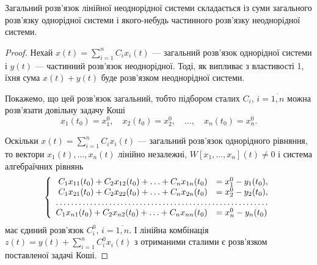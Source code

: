 \begin{theorem}
	Загальний розв'язок лінійної неоднорідної системи складається із суми загального розв'язку однорідної системи і якого-небудь частинного розв'язку неоднорідної системи.
\end{theorem}

\begin{proof}
	Нехай $x(t) = \sum_{i = 1}^n C_i x_i(t)$ --- загальний розв'язок однорідної системи і $y(t)$ --- частинний розв'язок неоднорідної. Тоді, як випливає з властивості 1, їхня сума $x(t) + y(t)$ буде розв'язком неоднорідної системи. \parvskip

	Покажемо, що цей розв'язок загальний, тобто підбором сталих $C_i$, $i = \overline{1, n}$  можна розв'язати довільну задачу Коші
	\begin{equation*}
		x_1(t_0) = x_1^0, \quad x_2(t_0) = x_2^0, \quad \ldots, \quad x_n(t_0) = x_n^0.
	\end{equation*}

	Оскільки $x(t) = \sum_{i = 1}^n C_i x_i(t)$ --- загальний розв'язок однорідного рівняння, то вектори $x_1(t), \ldots, x_n(t)$ лінійно незалежні, $W[x_1, \ldots, x_n](t) \ne 0$ і система алгебраїчних рівнянь
	\begin{equation*}
		\left\{
			\begin{array}{rl}
				C_1 x_{11}(t_0) + C_2 x_{12}(t_0) + \ldots + C_n x_{1n}(t_0) &= x_1^0 - y_1(t_0), \\
				C_1 x_{21}(t_0) + C_2 x_{22}(t_0) + \ldots + C_n x_{2n}(t_0) &= x_2^0 - y_2(t_0), \\
				\hdotsfor{2} \\
				C_1 x_{n1}(t_0) + C_2 x_{n2}(t_0) + \ldots + C_n x_{nn}(t_0) &= x_n^0 - y_n(t_0)
			\end{array}
		\right.
	\end{equation*}
 	має єдиний розв'язок $C_i^0$, $i = \overline{1, n}$. І лінійна комбінація $z(t) = y(t) + \sum_{i = 1}^n C_i^0 x_i(t)$ з отриманими сталими є розв'язком поставленої задачі Коші.
\end{proof}
